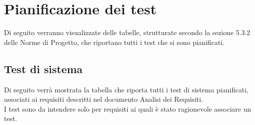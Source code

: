 \newpage

\section{Pianificazione dei test}
Di seguito verranno visualizzate delle tabelle, strutturate secondo la sezione 5.3.2 delle Norme di Progetto, che riportano tutti i test che si sono pianificati. \\
\subsection{Test di sistema}
Di seguito verrà mostrata la tabella che riporta tutti i test di sistema pianificati, associati ai requisiti descritti nel documento Analisi dei Requisiti.\\
I test sono da intendere solo per requisiti ai quali è stato ragionevole associare un test.
